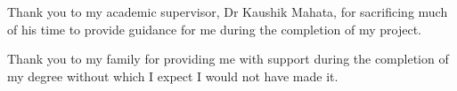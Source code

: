 \begin{acknowledgements}

Thank you to my academic supervisor, Dr Kaushik Mahata, for sacrificing much of his time to provide guidance for me during the completion of my project.

Thank you to my family for providing me with support during the completion of my degree without which I expect I would not have made it.
\newpage
\end{acknowledgements}